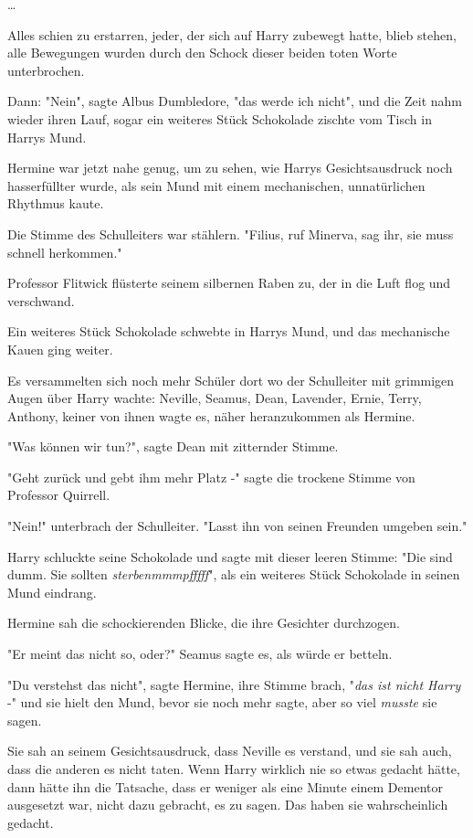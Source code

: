 {…

Alles schien zu erstarren, jeder, der sich auf Harry zubewegt hatte, blieb stehen, alle Bewegungen wurden durch den Schock dieser beiden toten Worte unterbrochen.

Dann: "Nein", sagte Albus Dumbledore, "das werde ich nicht", und die Zeit nahm wieder ihren Lauf, sogar ein weiteres Stück Schokolade zischte vom Tisch in Harrys Mund.

Hermine war jetzt nahe genug, um zu sehen, wie Harrys Gesichtsausdruck noch hasserfüllter wurde, als sein Mund mit einem mechanischen, unnatürlichen Rhythmus kaute.

Die Stimme des Schulleiters war stählern. "Filius, ruf Minerva, sag ihr, sie muss schnell herkommen."

Professor Flitwick flüsterte seinem silbernen Raben zu, der in die Luft flog und verschwand.

Ein weiteres Stück Schokolade schwebte in Harrys Mund, und das mechanische Kauen ging weiter.

Es versammelten sich noch mehr Schüler dort wo der Schulleiter mit grimmigen Augen über Harry wachte: Neville, Seamus, Dean, Lavender, Ernie, Terry, Anthony, keiner von ihnen wagte es, näher heranzukommen als Hermine.

"Was können wir tun?", sagte Dean mit zitternder Stimme.

"Geht zurück und gebt ihm mehr Platz -" sagte die trockene Stimme von Professor Quirrell.

"Nein!" unterbrach der Schulleiter. "Lasst ihn von seinen Freunden umgeben sein."

Harry schluckte seine Schokolade und sagte mit dieser leeren Stimme: "Die sind dumm. Sie sollten \emph{sterbenmmmpfffff}", als ein weiteres Stück Schokolade in seinen Mund eindrang.

Hermine sah die schockierenden Blicke, die ihre Gesichter durchzogen.

"Er meint das nicht so, oder?" Seamus sagte es, als würde er betteln.

"Du verstehst das nicht", sagte Hermine, ihre Stimme brach, "\emph{das ist nicht Harry} -" und sie hielt den Mund, bevor sie noch mehr sagte, aber so viel \emph{musste} sie sagen.

Sie sah an seinem Gesichtsausdruck, dass Neville es verstand, und sie sah auch, dass die anderen es nicht taten. Wenn Harry wirklich nie so etwas gedacht hätte, dann hätte ihn die Tatsache, dass er weniger als eine Minute einem Dementor ausgesetzt war, nicht dazu gebracht, es zu sagen. Das haben sie wahrscheinlich gedacht.

}
